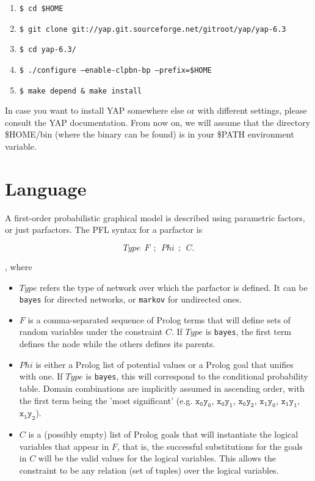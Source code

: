 \documentclass{article}
\begin{document}
\begin{enumerate}
 \setlength\itemindent{-0.01cm}
 \item \texttt{\$ cd \$HOME}
 \item \texttt{\$ git clone git://yap.git.sourceforge.net/gitroot/yap/yap-6.3}
 \item \texttt{\$ cd yap-6.3/}
 \item \texttt{\$ ./configure --enable-clpbn-bp --prefix=\$HOME}
 \item \texttt{\$ make depend \& make install}
\end{enumerate}

In case you want to install YAP somewhere else or with different settings, please consult the YAP documentation. From now on, we will assume that the directory \$HOME/bin (where the binary can be found) is in your \$PATH environment variable.

\section{Language}
A first-order probabilistic graphical model is described using parametric factors, or just parfactors. The PFL syntax for a parfactor is

$$Type~~F~~;~~Phi~~;~~C.$$

, where
\begin{itemize}
\item $Type$ refers the type of network over which the parfactor is defined. It can be \texttt{bayes} for directed networks, or \texttt{markov} for undirected ones.

\item $F$ is a comma-separated sequence of Prolog terms that will define sets of random variables under the constraint $C$. If $Type$ is \texttt{bayes}, the first term defines the node while the others defines its parents.

\item $Phi$ is either a Prolog list of potential values or a Prolog goal that unifies with one. If $Type$ is \texttt{bayes}, this will correspond to the conditional probability table. Domain combinations are implicitly assumed in ascending order, with the first term being the 'most significant' (e.g. $\mathtt{x_0y_0}$, $\mathtt{x_0y_1}$, $\mathtt{x_0y_2}$, $\mathtt{x_1y_0}$, $\mathtt{x_1y_1}$, $\mathtt{x_1y_2}$).

\item $C$ is a (possibly empty) list of Prolog goals that will instantiate the logical variables that appear in $F$, that is, the successful substitutions for the goals in $C$ will be the valid values for the logical variables. This allows the constraint to be any relation (set of tuples) over the logical variables.
\end{itemize}
\end{document}
